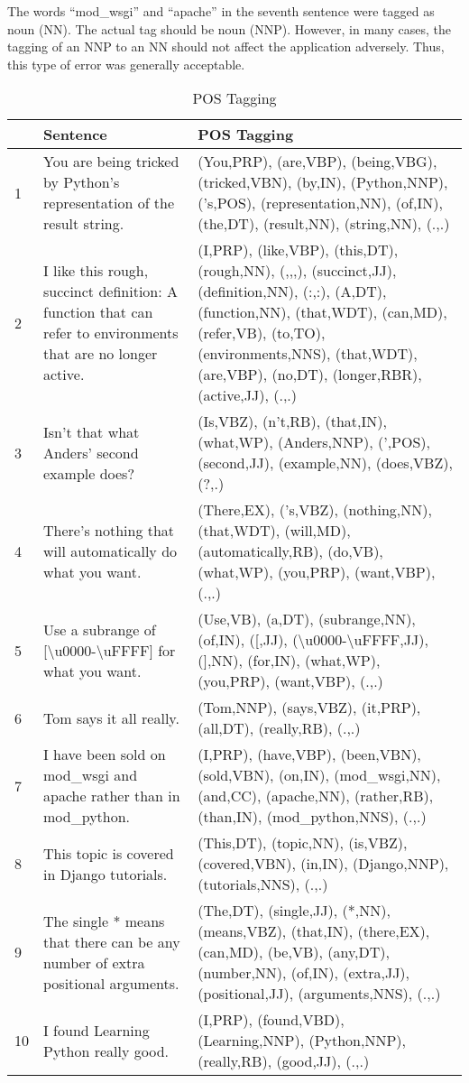 The words ``mod\_wsgi'' and ``apache'' in the seventh sentence were tagged as
noun (NN). The actual tag should be noun (NNP). However, in many cases, the
tagging of an NNP to an NN should not affect the application adversely. Thus,
this type of error was generally acceptable.

\begin{table}[htp]
\caption{POS Tagging}\label{pos}
\begin{tabu}{X[0.12,l]X[1,l]X[2,l]}
    & \textbf{Sentence} & \textbf{POS Tagging} \\
     & You are being tricked by Python's representation of the result
    string. &
    (You,PRP), (are,VBP), (being,VBG), (tricked,VBN), (by,IN), (Python,NNP),
    ('s,POS), (representation,NN), (of,IN), (the,DT), (result,NN), 
    (string,NN), (.,.) \\
    2 & I like this rough, succinct definition: A function that can refer to 
    environments that are no longer active. &
    (I,PRP), (like,VBP), (this,DT), (rough,NN), (,,,), (succinct,JJ),
    (definition,NN), (:,:), (A,DT), (function,NN), (that,WDT), (can,MD),
    (refer,VB), (to,TO), (environments,NNS), (that,WDT), (are,VBP), (no,DT),
    (longer,RBR), (active,JJ), (.,.) \\
    3 & Isn't that what Anders' second example does? &
    (Is,VBZ), (n't,RB), (that,IN), (what,WP), (Anders,NNP), (',POS),
    (second,JJ), (example,NN), (does,VBZ), (?,.) \\
    4 & There's nothing that will automatically do what you want. & 
    (There,EX), ('s,VBZ), (nothing,NN), (that,WDT), (will,MD),
    (automatically,RB), (do,VB), (what,WP), (you,PRP), (want,VBP), (.,.) \\
    5 & Use a subrange of [\textbackslash{}u0000-\textbackslash{}uFFFF] for
    what you want. & 
    (Use,VB), (a,DT), (subrange,NN), (of,IN), ([,JJ),
    (\textbackslash{}u0000-\textbackslash{}uFFFF,JJ), (],NN),
    (for,IN), (what,WP), (you,PRP), (want,VBP), (.,.) \\
    6 & Tom says it all really. &
    (Tom,NNP), (says,VBZ), (it,PRP), (all,DT), (really,RB), (.,.) \\
    7 & I have been sold on mod\_wsgi and apache rather than in mod\_python. &
    (I,PRP), (have,VBP), (been,VBN), (sold,VBN), (on,IN), (mod\_wsgi,NN),
    (and,CC), (apache,NN), (rather,RB), (than,IN), (mod\_python,NNS), (.,.) \\
    8 & This topic is covered in Django tutorials. &
    (This,DT), (topic,NN), (is,VBZ), (covered,VBN), (in,IN), (Django,NNP),
    (tutorials,NNS), (.,.) \\
    9 & The single * means that there can be any number of extra positional
    arguments. &
    (The,DT), (single,JJ), (*,NN), (means,VBZ), (that,IN), (there,EX), (can,MD),
    (be,VB), (any,DT), (number,NN), (of,IN), (extra,JJ), (positional,JJ),
    (arguments,NNS), (.,.) \\
    10 & I found Learning Python really good. &
    (I,PRP), (found,VBD), (Learning,NNP), (Python,NNP), (really,RB), (good,JJ),
    (.,.) \\    
\end{tabu} 
\end{table}

